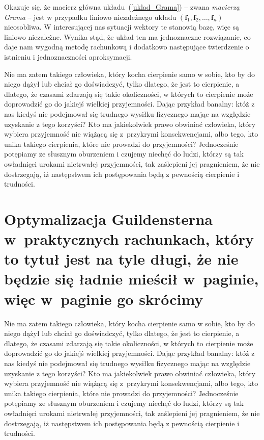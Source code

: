 \documentclass[12pt]{mwbk}
\theoremstyle{plain}
\theoremstyle{definition}
\theoremstyle{remark}
\newcommand{\ff}{\mathbf{f}}
\begin{document}
Okazuje się, że macierz główna układu~(\ref{uklad_Grama}) -- zwana
\emph{macierzą Grama} -- jest w przypadku liniowo niezależnego układu
$(\ff_1,\ff_2,\ldots,\ff_n)$ nieosobliwa. W interesującej nas sytuacji
wektory te stanowią bazę, więc są liniowo niezależne. Wynika stąd, że
układ ten ma jednoznaczne rozwiązanie, co daje nam wygodną metodę
rachunkową i dodatkowo następujące twierdzenie o istnieniu i
jednoznaczności aproksymacji.

Nie ma zatem takiego człowieka, który kocha cierpienie samo w sobie, 
kto by do niego dążył lub chciał go doświadczyć, tylko dlatego, że
jest to cierpienie, a dlatego, że czasami zdarzają się takie 
okoliczności, w których to cierpienie może doprowadzić 
go do jakiejś wielkiej przyjemności. 
Dając przykład banalny: któż z nas kiedyś nie podejmował 
się trudnego wysiłku fizycznego mając na względzie 
uzyskanie z tego korzyści? 
Kto ma jakiekolwiek prawo obwiniać człowieka, 
który wybiera przyjemność nie wiążącą się z~przykrymi 
konsekwencjami, albo tego, kto unika takiego cierpienia, 
które nie prowadzi do przyjemności? 
Jednocześnie potępiamy ze słusznym oburzeniem i czujemy 
niechęć do ludzi, którzy są tak owładnięci urokami nietrwałej 
przyjemności, tak zaślepieni jej pragnieniem, 
że nie dostrzegają, iż następstwem ich 
postępowania będą z pewnością cierpienie i trudności.

\chapter[Optymalizacja Guildensterna w~praktycznych rachunkach\ldots]{Optymalizacja 
Guildensterna w~praktycznych rachunkach, który to tytuł jest na tyle długi, 
że nie będzie się ładnie mieścił w~paginie, więc w~paginie go skrócimy}

Nie ma zatem takiego człowieka, który kocha cierpienie samo w sobie, 
kto by do niego dążył lub chciał go doświadczyć, tylko dlatego, że
jest to cierpienie, a dlatego, że czasami zdarzają się takie 
okoliczności, w których to cierpienie może doprowadzić 
go do jakiejś wielkiej przyjemności. 
Dając przykład banalny: któż z nas kiedyś nie podejmował 
się trudnego wysiłku fizycznego mając na względzie 
uzyskanie z tego korzyści? 
Kto ma jakiekolwiek prawo obwiniać człowieka, 
który wybiera przyjemność nie wiążącą się z~przykrymi 
konsekwencjami, albo tego, kto unika takiego cierpienia, 
które nie prowadzi do przyjemności? 
Jednocześnie potępiamy ze słusznym oburzeniem i czujemy 
niechęć do ludzi, którzy są tak owładnięci urokami nietrwałej 
przyjemności, tak zaślepieni jej pragnieniem, 
że nie dostrzegają, iż następstwem ich 
postępowania będą z pewnością cierpienie i trudności.
\end{document}
